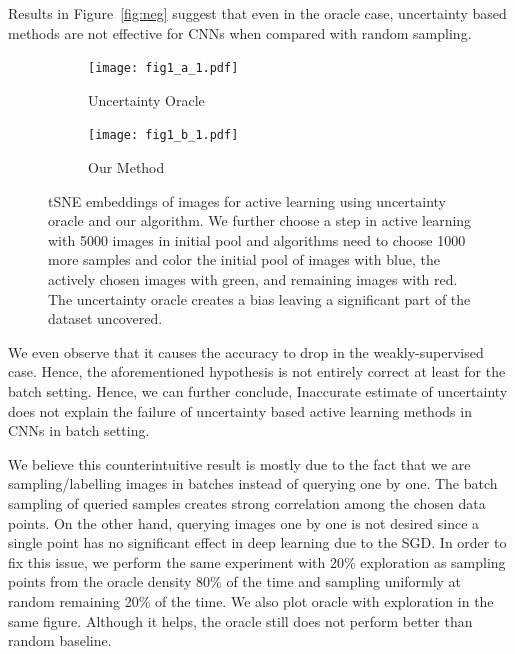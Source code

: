 \documentclass{article}
\begin{document}
Results in Figure~\ref{fig:neg} suggest that even in the oracle case, uncertainty based methods are not effective for CNNs when compared with random sampling. {\par}

\begin{figure}
\vspace{-10mm}
  \begin{center}
    \begin{subfigure}[b]{0.23\textwidth}
		\texttt{[image: fig1\_a\_1.pdf]}
		\vspace{-5mm}
		\caption{Uncertainty Oracle}
    \end{subfigure}
    \begin{subfigure}[b]{0.23\textwidth}
		\texttt{[image: fig1\_b\_1.pdf]}
		\vspace{-5mm}
		\caption{Our Method}
    \end{subfigure}
\end{center}
\vspace{-3mm}
 \caption{tSNE embeddings of images for active learning using uncertainty oracle and our algorithm. We further choose a step in active learning with 5000 images in initial pool and algorithms need to choose 1000 more samples and color the initial pool of images with blue, the actively chosen images with green, and remaining images with red. The uncertainty oracle creates a bias leaving a significant part of the dataset uncovered. }
\label{fig:tsne}
\vspace{-10mm}
\end{figure}



\noindent We even observe that it causes the accuracy to drop in the weakly-supervised case. Hence, the aforementioned hypothesis is not entirely correct at least for the batch setting. Hence, we can further conclude, Inaccurate estimate of uncertainty does not explain the failure of uncertainty based active learning methods in CNNs in batch setting.

We believe this counterintuitive result is mostly due to the fact that we are sampling/labelling images in batches instead of querying one by one. The batch sampling of queried samples creates strong correlation among the chosen data points. On the other hand, querying images one by one is not desired since a single point has no significant effect in deep learning due to the SGD. In order to fix this issue, we perform the same experiment with 20\% exploration as sampling points from the oracle density 80\% of the time and sampling uniformly at random remaining 20\% of the time. We also plot oracle with exploration in the same figure. Although it helps, the oracle still does not perform better than random baseline.
\end{document}
